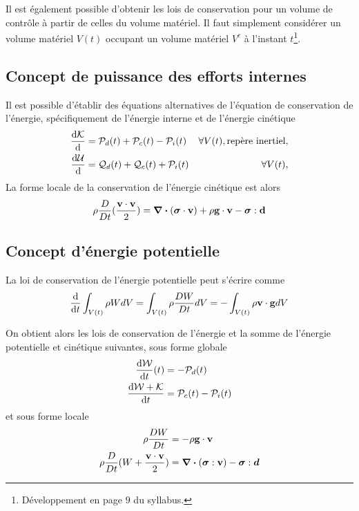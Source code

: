 \documentclass[a4paper,11pt]{report}
\newcommand{\bs}[1]{\boldsymbol{#1}}
\newcommand{\dvm}[2]{\frac{D #1}{D #2}}
\begin{document}
      Il est également possible d'obtenir les lois de conservation pour un volume de contrôle à partir de celles du volume matériel. Il faut simplement considérer un volume matériel $V(t)$ occupant un volume matériel $V^c$ à l'instant $t$\footnote{Développement en page $9$ du syllabus.}.

    \subsection{Concept de puissance des efforts internes}
      Il est possible d'établir des équations alternatives de l'équation de conservation de l'énergie, spécifiquement de l'énergie interne et de l'énergie cinétique
      \begin{equation}\begin{aligned}
        \dv{\mathcal{K}} {}(t) &= \mathcal{P}_d(t) + \mathcal{P}_c(t) - \mathcal{P}_i(t) & \forall V(t), \textrm{repère inertiel},\\
        \dv{\mathcal{U}} {}(t) &= \mathcal{Q}_d(t) + \mathcal{Q}_c(t) + \mathcal{P}_i(t) & \forall V(t),
      \end{aligned}\end{equation}
      La forme locale de la conservation de l'énergie cinétique est alors
      \begin{equation}
        \rho \dvm{}{t}(\frac{\vb{v}\cdot \vb{v}}{2}) = \div (\bs{\sigma} \cdot \vb{v}) + \rho \vb{g} \cdot \vb{v} - \bs{\sigma} : \vb{d}
      \end{equation}

      \subsection{Concept d'énergie potentielle}
        La loi de conservation de l'énergie potentielle peut s'écrire comme
        \begin{equation}
          \dv{t}\int_{V(t)} \rho W dV = \int_{V(t)} \rho \dvm{W}{t} dV = - \int_{V(t)} \rho \vb{v} \cdot \vb{g} dV
        \end{equation}

        On obtient alors les lois de conservation de l'énergie et la somme de l'énergie potentielle et cinétique suivantes, sous forme globale
        \begin{equation}\begin{aligned}
            \dv{\mathcal{W}}{t} {}(t) &= -\mathcal{P}_d(t)\\
            \dv{\mathcal{W} + \mathcal{K}}{t} &= \mathcal{P}_c(t) - \mathcal{P}_i(t)
        \end{aligned}\end{equation}
        et sous forme locale
        \begin{align}
          \rho \dvm{W}{t} &= -\rho \vb{g} \cdot \vb{v}\\
          \rho \dvm{}{t}(W + \frac{\vb{v} \cdot\vb{v}}{2}) &= \div (\bs{\sigma} : \vb{v}) - \bs{\sigma} : \bs{d}\nonumber
        \end{align}
\end{document}
